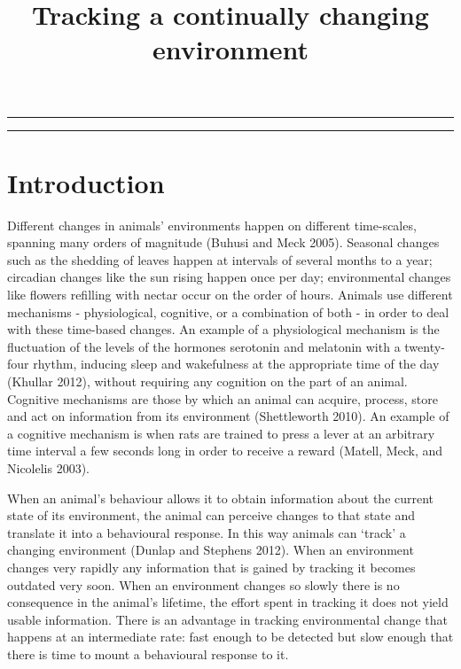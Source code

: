 \documentclass[
]{article}
\title{Tracking a continually changing environment}
\author{}
\date{\vspace{-2.5em}}
\begin{document}
\maketitle

\begin{center}\rule{0.5\linewidth}{0.5pt}\end{center}

\begin{center}\rule{0.5\linewidth}{0.5pt}\end{center}

\hypertarget{introduction}{%
\section{Introduction}\label{introduction}}

Different changes in animals' environments happen on different time-scales, spanning many orders of magnitude (Buhusi and Meck 2005). Seasonal changes such as the shedding of leaves happen at intervals of several months to a year; circadian changes like the sun rising happen once per day; environmental changes like flowers refilling with nectar occur on the order of hours. Animals use different mechanisms - physiological, cognitive, or a combination of both - in order to deal with these time-based changes. An example of a physiological mechanism is the fluctuation of the levels of the hormones serotonin and melatonin with a twenty-four rhythm, inducing sleep and wakefulness at the appropriate time of the day (Khullar 2012), without requiring any cognition on the part of an animal. Cognitive mechanisms are those by which an animal can acquire, process, store and act on information from its environment (Shettleworth 2010). An example of a cognitive mechanism is when rats are trained to press a lever at an arbitrary time interval a few seconds long in order to receive a reward (Matell, Meck, and Nicolelis 2003).

When an animal's behaviour allows it to obtain information about the current state of its environment, the animal can perceive changes to that state and translate it into a behavioural response. In this way animals can `track' a changing environment (Dunlap and Stephens 2012). When an environment changes very rapidly any information that is gained by tracking it becomes outdated very soon. When an environment changes so slowly there is no consequence in the animal's lifetime, the effort spent in tracking it does not yield usable information. There is an advantage in tracking environmental change that happens at an intermediate rate: fast enough to be detected but slow enough that there is time to mount a behavioural response to it.
\end{document}
